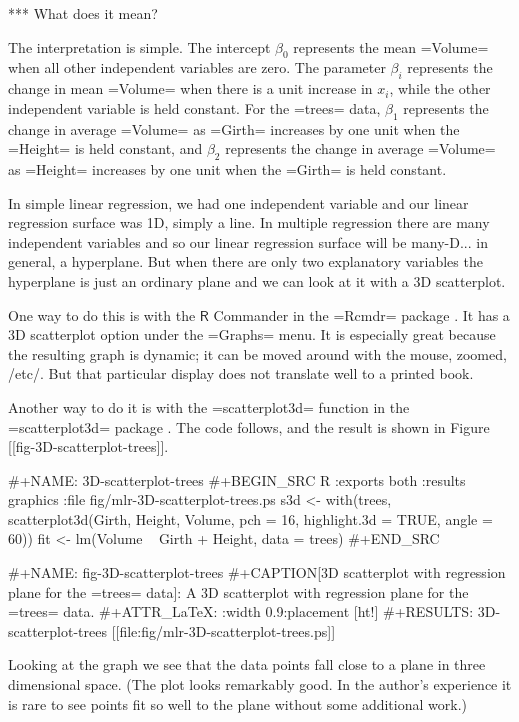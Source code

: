 *** What does it mean?

The interpretation is simple. The intercept \(\beta_{0}\) represents
the mean =Volume= when all other independent variables are zero. The
parameter \(\beta_{i}\) represents the change in mean =Volume= when
there is a unit increase in \(x_{i}\), while the other independent
variable is held constant. For the =trees= data, \(\beta_{1}\)
represents the change in average =Volume= as =Girth= increases by one
unit when the =Height= is held constant, and \(\beta_{2}\) represents
the change in average =Volume= as =Height= increases by one unit when
the =Girth= is held constant.


In simple linear regression, we had one independent variable and our
linear regression surface was 1D, simply a line. In multiple
regression there are many independent variables and so our linear
regression surface will be many-D... in general, a hyperplane. But
when there are only two explanatory variables the hyperplane is just
an ordinary plane and we can look at it with a 3D scatterplot.

One way to do this is with the \(\mathsf{R}\) Commander in the =Rcmdr=
package \cite{Rcmdr}. It has a 3D scatterplot option under the
=Graphs= menu. It is especially great because the resulting graph is
dynamic; it can be moved around with the mouse, zoomed, /etc/. But
that particular display does not translate well to a printed book.

Another way to do it is with the =scatterplot3d= function in the
=scatterplot3d= package \cite{scatterplot3d}. The code follows, and
the result is shown in Figure [[fig-3D-scatterplot-trees]].

#+NAME: 3D-scatterplot-trees
#+BEGIN_SRC R :exports both :results graphics :file fig/mlr-3D-scatterplot-trees.ps
s3d <- with(trees, scatterplot3d(Girth, Height, Volume, pch = 16, 
                                 highlight.3d = TRUE, angle = 60))
fit <- lm(Volume ~ Girth + Height, data = trees)
#+END_SRC

#+NAME: fig-3D-scatterplot-trees
#+CAPTION[3D scatterplot with regression plane for the =trees= data]: \small A 3D scatterplot with regression plane for the =trees= data.
#+ATTR_LaTeX: :width 0.9\textwidth :placement [ht!]
#+RESULTS: 3D-scatterplot-trees
[[file:fig/mlr-3D-scatterplot-trees.ps]]

Looking at the graph we see that the data points fall close to a plane
in three dimensional space. (The plot looks remarkably good. In the
author's experience it is rare to see points fit so well to the plane
without some additional work.)

